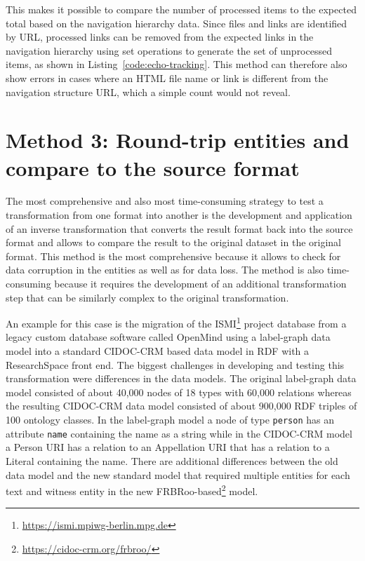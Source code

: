 \documentclass[final]{anthology-ch} %
\begin{document}
This makes it possible to compare the number of processed items to the expected total based on the navigation hierarchy data. Since files and links are identified by URL, processed links can be removed from the expected links in the navigation hierarchy using set operations to generate the set of unprocessed items, as shown in Listing~\ref{code:echo-tracking}. This method can therefore also show errors in cases where an HTML file name or link is different from the navigation structure URL, which a simple count would not reveal.

\section{Method 3: Round-trip entities and compare to the source format}

The most comprehensive and also most time-consuming strategy to test a transformation from one format into another is the development and application of an inverse transformation that converts the result format back into the source format and allows to compare the result to the original dataset in the original format. This method is the most comprehensive because it allows to check for data corruption in the entities as well as for data loss. The method is also time-consuming because it requires the development of an additional transformation step that can be similarly complex to the original transformation.

An example for this case is the migration of the ISMI\footnote{\url{https://ismi.mpiwg-berlin.mpg.de}} project database from a legacy custom database software called OpenMind using a label-graph data model into a standard CIDOC-CRM based data model in RDF with a ResearchSpace front end. The biggest challenges in developing and testing this transformation were differences in the data models. The original label-graph data model consisted of about 40,000 nodes of 18 types with 60,000 relations whereas the resulting CIDOC-CRM data model consisted of about 900,000 RDF triples of 100 ontology classes. In the label-graph model a node of type \texttt{person} has an attribute \texttt{name} containing the name as a string while in the CIDOC-CRM model a Person URI has a relation to an Appellation URI that has a relation to a Literal containing the name. There are additional differences between the old data model and the new standard model that required multiple entities for each text and witness entity in the new FRBRoo-based\footnote{\url{https://cidoc-crm.org/frbroo/}} model.
\end{document}
